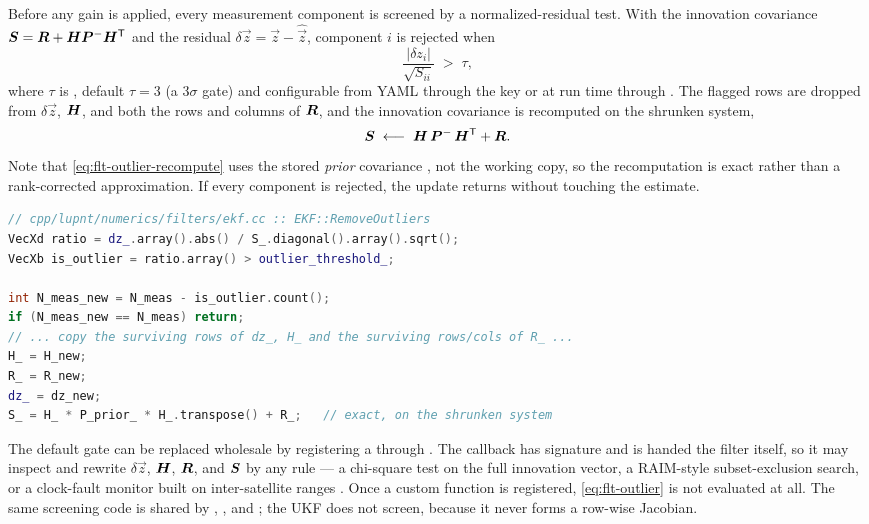Before any gain is applied, every measurement component is screened by a
normalized-residual test. With the innovation covariance
$\bm{S} = \bm{R} + \bm{H}\bm{P}^{-}\bm{H}^{\mathsf{T}}$ and the residual
$\delta \vec{z} = \vec{z} - \hat{\vec{z}}$, component $i$ is rejected when
\begin{equation}
  \label{eq:flt-outlier}
  \frac{\lvert \delta z_i \rvert}{\sqrt{S_{ii}}} \;>\; \tau ,
\end{equation}
where $\tau$ is , default $\tau = 3$ (a
$3\sigma$ gate) and configurable from YAML through the
 key or at run time through
. The flagged rows are dropped from $\delta \vec{z}$,
$\bm{H}$, and both the rows and columns of $\bm{R}$, and the innovation
covariance is recomputed on the shrunken system,
\begin{equation}
  \label{eq:flt-outlier-recompute}
  \bm{S} \;\longleftarrow\; \bm{H}\,\bm{P}^{-}\,\bm{H}^{\mathsf{T}} + \bm{R} .
\end{equation}
Note that \cref{eq:flt-outlier-recompute} uses the stored \emph{prior}
covariance , not the working copy, so the recomputation is
exact rather than a rank-corrected approximation. If every component is
rejected, the update returns without touching the estimate.

\begin{lstlisting}[language=cpp, caption={Normalized-residual outlier gate.},
                   label={lst:flt-outliers}]
// cpp/lupnt/numerics/filters/ekf.cc :: EKF::RemoveOutliers
VecXd ratio = dz_.array().abs() / S_.diagonal().array().sqrt();
VecXb is_outlier = ratio.array() > outlier_threshold_;

int N_meas_new = N_meas - is_outlier.count();
if (N_meas_new == N_meas) return;
// ... copy the surviving rows of dz_, H_ and the surviving rows/cols of R_ ...
H_ = H_new;
R_ = R_new;
dz_ = dz_new;
S_ = H_ * P_prior_ * H_.transpose() + R_;   // exact, on the shrunken system
\end{lstlisting}

The default gate can be replaced wholesale by registering a
 through . The
callback has signature  and is handed the filter
itself, so it may inspect and rewrite $\delta \vec{z}$, $\bm{H}$, $\bm{R}$,
and $\bm{S}$ by any rule --- a chi-square test on the full innovation vector,
a RAIM-style subset-exclusion search, or a clock-fault monitor built on
inter-satellite ranges \citep{iiyama2026edm}. Once a custom function is
registered, \cref{eq:flt-outlier} is not evaluated at all. The same screening
code is shared by , , and ; the UKF does not
screen, because it never forms a row-wise Jacobian.

